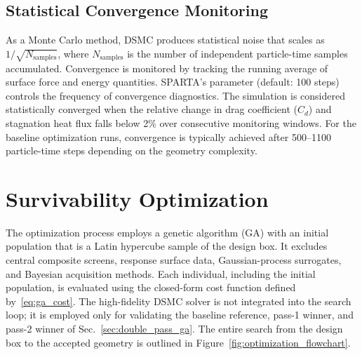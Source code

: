 \subsection{Statistical Convergence Monitoring}
As a Monte Carlo method, DSMC produces statistical noise that scales as $1/\sqrt{N_{\text{samples}}}$, where $N_{\text{samples}}$ is the number of independent particle-time samples accumulated. Convergence is monitored by tracking the running average of surface force and energy quantities. SPARTA's \texttt{} parameter (default: 100 steps) controls the frequency of convergence diagnostics. The simulation is considered statistically converged when the relative change in drag coefficient ($C_d$) and stagnation heat flux falls below 2\% over consecutive monitoring windows. For the baseline optimization runs, convergence is typically achieved after 500--1100 particle-time steps depending on the geometry complexity.


\section{Survivability Optimization}
\label{sec:ga_opt}

The optimization process employs a genetic algorithm (GA) with an initial population that is a Latin hypercube sample of the design box. It excludes central composite screens, response surface data, Gaussian-process surrogates, and Bayesian acquisition methods. Each individual, including the initial population, is evaluated using the closed-form cost function defined by~\eqref{eq:ga_cost}. The high-fidelity DSMC solver is not integrated into the search loop; it is employed only for validating the baseline reference, pass-1 winner, and pass-2 winner of Sec.~\ref{sec:double_pass_ga}. The entire search from the design box to the accepted geometry is outlined in Figure~\ref{fig:optimization_flowchart}.

